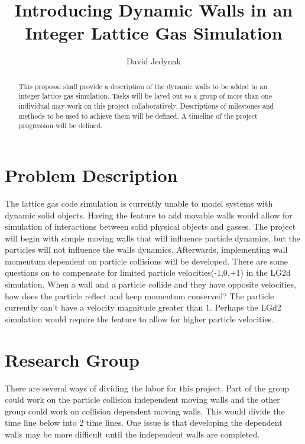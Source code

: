 \documentclass{article}
\begin{document}
\lstset{language=C} 
\title{Introducing Dynamic Walls in an Integer Lattice Gas Simulation}
\author{David Jedynak}
\maketitle
\begin{abstract}
This proposal shall provide a description of the dynamic walls to be added to an integer lattice gas simulation. Tasks will be layed out so  a group of more than one individual may work on this project collaboratively. Descriptions of milestones and methods to be used to achieve them will be defined. A timeline of the project progression will be defined.
\end{abstract}
\section{Problem Description}
The lattice gas code simulation is currently unable to model systems with dynamic solid objects. Having the feature to add movable walls would allow for simulation of interactions between solid physical objects and gasses. The project will begin with simple moving walls that will influence particle dynamics, but the particles will not influence the walls dynamics. Afterwards, implementing wall momentum dependent on particle collisions will be developed. There are some questions on to compensate for limited particle velocities(-1,0,+1) in the LG2d simulation. When a wall and a particle collide and they have opposite velocities, how does the particle reflect and keep momentum conserved? The particle currently can't have a velocity magnitude greater than 1. Perhaps the LGd2 simulation would require the feature to allow for higher particle velocities.
\section{Research Group}
There are several ways of dividing the labor for this project. Part of the group could work on the particle collision independent moving walls and the other group could work on collision dependent moving walls. This would divide the time line below into 2 time lines. One issue is that developing the dependent walls may be more difficult until the independent walls are completed. 
\end{document}
